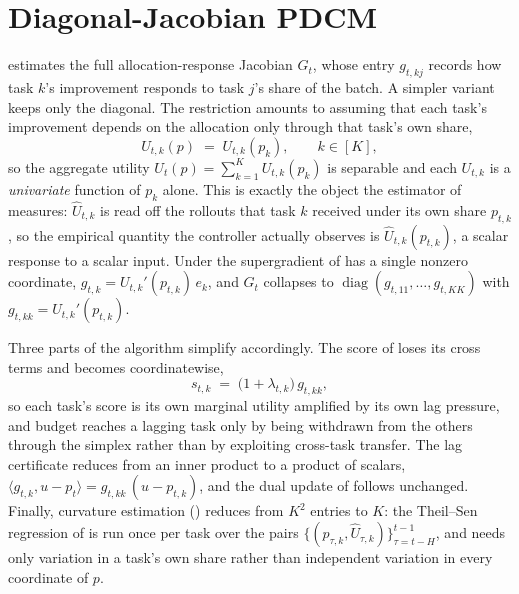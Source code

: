 \section{Diagonal-Jacobian PDCM}
\label{app:diagonal}




 estimates the full allocation-response Jacobian $G_t$, whose entry
$g_{t,kj}$ records how task $k$'s improvement responds to task $j$'s share of the batch. A
simpler variant keeps only the diagonal. The restriction amounts to assuming that each task's improvement depends on the allocation only
through that task's own share,
\begin{equation}
U_{t,k}(p) \;=\; U_{t,k}(p_k), \qquad k\in[K],
\label{eq:separable-utility}
\end{equation}
so the aggregate utility $U_t(p)=\sum_{k=1}^K U_{t,k}(p_k)$ is separable and each $U_{t,k}$ is a
\emph{univariate} function of $p_k$ alone. This is exactly the object the estimator of
 measures: $\widehat U_{t,k}$ is read off the rollouts
that task $k$ received under its own share $p_{t,k}$, so the empirical quantity the controller
actually observes is $\widehat U_{t,k}(p_{t,k})$, a scalar response to a scalar input. Under
 the supergradient of  has a single nonzero
coordinate, $g_{t,k}=U_{t,k}'(p_{t,k})\,e_k$, and $G_t$ collapses to
$\operatorname{diag}(g_{t,11},\ldots,g_{t,KK})$ with $g_{t,kk}=U_{t,k}'(p_{t,k})$.

Three parts of the algorithm simplify accordingly. The score of
 loses its cross terms and becomes
coordinatewise,
\begin{equation}
s_{t,k} \;=\; \bigl(1+\lambda_{t,k}\bigr)\, g_{t,kk},
\label{eq:diag-score}
\end{equation}
so each task's score is its own marginal utility amplified by its own lag pressure, and budget
reaches a lagging task only by being withdrawn from the others through the simplex rather than
by exploiting cross-task transfer. The lag certificate reduces from an inner product to a
product of scalars, $\langle g_{t,k},u-p_t\rangle = g_{t,kk}\,(u-p_{t,k})$, and the dual update
of  follows unchanged. Finally, curvature estimation
() reduces from $K^2$ entries to $K$: the Theil--Sen regression of
 is run once per task over the pairs
$\{(p_{\tau,k},\widehat U_{\tau,k})\}_{\tau=t-H}^{t-1}$, and needs only variation in a task's
own share rather than independent variation in every coordinate of $p$.

